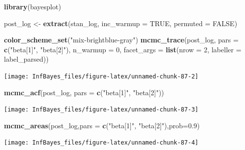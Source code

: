 \documentclass[
]{book}
\newenvironment{Shaded}{\begin{snugshade}}{\end{snugshade}}
\newcommand{\DataTypeTok}[1]{\textcolor[rgb]{0.13,0.29,0.53}{#1}}
\newcommand{\DecValTok}[1]{\textcolor[rgb]{0.00,0.00,0.81}{#1}}
\newcommand{\FloatTok}[1]{\textcolor[rgb]{0.00,0.00,0.81}{#1}}
\newcommand{\KeywordTok}[1]{\textcolor[rgb]{0.13,0.29,0.53}{\textbf{#1}}}
\newcommand{\NormalTok}[1]{#1}
\newcommand{\OtherTok}[1]{\textcolor[rgb]{0.56,0.35,0.01}{#1}}
\newcommand{\StringTok}[1]{\textcolor[rgb]{0.31,0.60,0.02}{#1}}
\begin{document}
\begin{Shaded}
\begin{Highlighting}[]
\KeywordTok{library}\NormalTok{(bayesplot)}

\NormalTok{post_log <-}\StringTok{ }\KeywordTok{extract}\NormalTok{(stan_log, }\DataTypeTok{inc_warmup =} \OtherTok{TRUE}\NormalTok{, }\DataTypeTok{permuted =} \OtherTok{FALSE}\NormalTok{)}

\KeywordTok{color_scheme_set}\NormalTok{(}\StringTok{"mix-brightblue-gray"}\NormalTok{)}
\KeywordTok{mcmc_trace}\NormalTok{(post_log,  }\DataTypeTok{pars =} \KeywordTok{c}\NormalTok{(}\StringTok{"beta[1]"}\NormalTok{, }\StringTok{"beta[2]"}\NormalTok{), }\DataTypeTok{n_warmup =} \DecValTok{0}\NormalTok{,}
                \DataTypeTok{facet_args =} \KeywordTok{list}\NormalTok{(}\DataTypeTok{nrow =} \DecValTok{2}\NormalTok{, }\DataTypeTok{labeller =}\NormalTok{ label_parsed))}
\end{Highlighting}
\end{Shaded}

\begin{center}\texttt{[image: InfBayes\_files/figure-latex/unnamed-chunk-87-2]} \end{center}

\begin{Shaded}
\begin{Highlighting}[]
\KeywordTok{mcmc_acf}\NormalTok{(post_log, }\DataTypeTok{pars =} \KeywordTok{c}\NormalTok{(}\StringTok{"beta[1]"}\NormalTok{, }\StringTok{"beta[2]"}\NormalTok{))}
\end{Highlighting}
\end{Shaded}

\begin{center}\texttt{[image: InfBayes\_files/figure-latex/unnamed-chunk-87-3]} \end{center}

\begin{Shaded}
\begin{Highlighting}[]
\KeywordTok{mcmc_areas}\NormalTok{(post_log,}\DataTypeTok{pars =} \KeywordTok{c}\NormalTok{(}\StringTok{"beta[1]"}\NormalTok{, }\StringTok{"beta[2]"}\NormalTok{),}\DataTypeTok{prob=}\FloatTok{0.9}\NormalTok{)}
\end{Highlighting}
\end{Shaded}

\begin{center}\texttt{[image: InfBayes\_files/figure-latex/unnamed-chunk-87-4]} \end{center}
\end{document}
